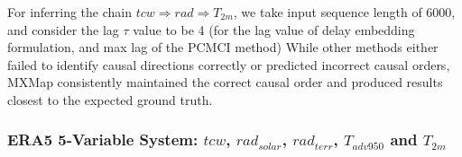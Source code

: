 \begin{table}[hbt]
\centering
{}
\caption{Causal inference methods on the ERA5 3V system.}
\label{tab:mxmap-era5}
\end{table}

For inferring the chain $tcw \Rightarrow rad \Rightarrow T_{2m}$, we take input sequence length of 6000, and consider the lag $\tau$ value to be 4 (for the lag value of delay embedding formulation, and max lag of the PCMCI method) While other methods either failed to identify causal directions correctly or predicted incorrect causal orders, MXMap consistently maintained the correct causal order and produced results closest to the expected ground truth.

\subsubsection{ERA5 5-Variable System: $tcw$, $rad_{solar}$, $rad_{terr}$, $T_{adv950}$ and $T_{2m}$}
\label{sec:era5_5V_eval}

